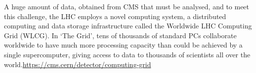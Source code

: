 





A huge amount of data, obtained from CMS that must be analysed, and to meet this challenge, the LHC employs a novel computing system, a distributed computing and data storage infrastructure called the Worldwide LHC Computing Grid (WLCG). In ‘The Grid’, tens of thousands of standard PCs collaborate worldwide to have much more processing capacity than could be achieved by a single supercomputer, giving access to data to thousands of scientists all over the world.\url{https://cms.cern/detector/computing-grid}


